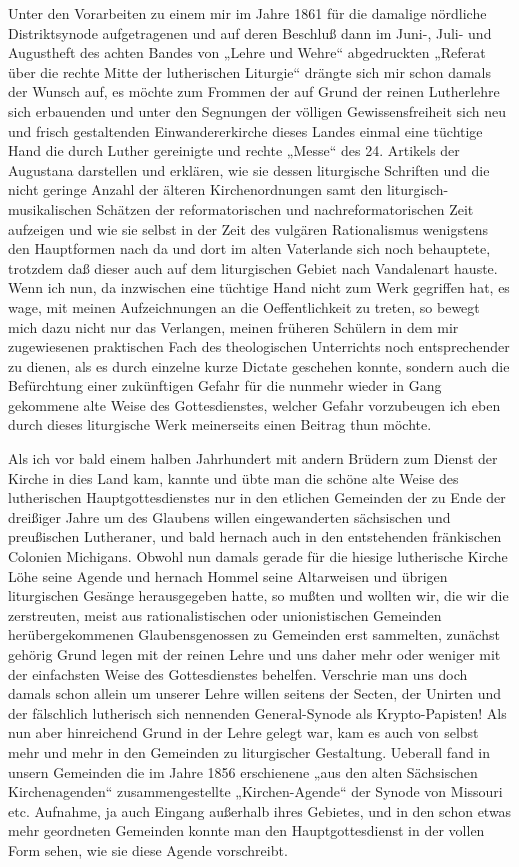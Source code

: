 Unter den Vorarbeiten zu einem mir im Jahre 1861 für die damalige nördliche Distriktsynode aufgetragenen und auf deren Beschluß dann im Juni-, Juli- und Augustheft des achten Bandes von „Lehre und Wehre“ abgedruckten „Referat über die rechte Mitte der lutherischen Liturgie“ drängte sich mir schon damals der Wunsch auf, es möchte zum Frommen der auf Grund der reinen Lutherlehre sich erbauenden und unter den Segnungen der völligen Gewissensfreiheit sich neu und frisch gestaltenden Einwandererkirche dieses Landes einmal eine tüchtige Hand die durch Luther gereinigte und rechte „Messe“ des 24. Artikels der Augustana darstellen und erklären, wie sie dessen liturgische Schriften und die nicht geringe Anzahl der älteren Kirchenordnungen samt
den liturgisch-musikalischen Schätzen der reformatorischen und nachreformatorischen Zeit aufzeigen und wie sie selbst in der Zeit des vulgären Rationalismus wenigstens den Hauptformen nach da und dort im alten Vaterlande sich noch behauptete, trotzdem daß dieser auch auf dem liturgischen Gebiet nach Vandalenart hauste. Wenn ich nun, da inzwischen eine tüchtige Hand nicht zum Werk gegriffen hat, es wage, mit meinen Aufzeichnungen an die Oeffentlichkeit zu treten, so bewegt mich dazu nicht nur das Verlangen, meinen früheren Schülern in dem mir zugewiesenen praktischen Fach des theologischen Unterrichts noch entsprechender zu dienen, als es durch einzelne kurze Dictate geschehen konnte, sondern auch die Befürchtung einer zukünftigen Gefahr für die nunmehr wieder in Gang gekommene alte Weise des Gottesdienstes, welcher Gefahr vorzubeugen ich eben durch dieses liturgische Werk meinerseits einen Beitrag thun möchte.

Als ich vor bald einem halben Jahrhundert mit andern Brüdern zum Dienst der Kirche in dies Land kam, kannte und übte man die schöne alte Weise des lutherischen Hauptgottesdienstes nur in den etlichen Gemeinden der zu Ende der dreißiger Jahre um des Glaubens willen eingewanderten sächsischen und preußischen Lutheraner, und bald hernach auch in den entstehenden fränkischen Colonien Michigans. Obwohl nun damals gerade für die hiesige lutherische Kirche Löhe seine Agende und hernach Hommel seine Altarweisen und übrigen liturgischen Gesänge herausgegeben hatte, so mußten und wollten wir, die wir die zerstreuten, meist aus rationalistischen oder unionistischen Gemeinden herübergekommenen Glaubensgenossen zu Gemeinden erst sammelten, zunächst gehörig Grund legen mit der reinen Lehre und uns daher mehr oder weniger mit der einfachsten Weise des Gottesdienstes behelfen. Verschrie man uns doch damals schon allein um unserer Lehre willen seitens der Secten, der Unirten und der fälschlich lutherisch sich nennenden General-Synode als Krypto-Papisten! Als nun aber hinreichend Grund in der Lehre gelegt war, kam es auch von selbst mehr und mehr in den Gemeinden zu liturgischer Gestaltung. Ueberall fand in unsern Gemeinden die im Jahre 1856 erschienene „aus den alten Sächsischen Kirchenagenden“ zusammengestellte „Kirchen-Agende“ der Synode von Missouri etc. Aufnahme, ja auch Eingang außerhalb ihres Gebietes, und in den schon etwas mehr geordneten Gemeinden konnte man den Hauptgottesdienst in der vollen Form sehen, wie sie diese Agende vorschreibt.


